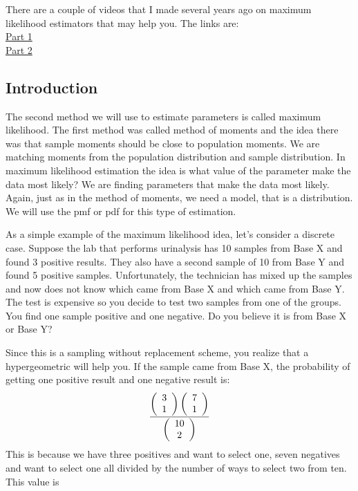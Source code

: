 \documentclass[]{book}
\theoremstyle{definition}
\theoremstyle{definition}
\theoremstyle{definition}
\theoremstyle{remark}
\begin{document}
There are a couple of videos that I made several years ago on maximum
likelihood estimators that may help you. The links are:\\
\href{https://www.youtube.com/watch?v=Y17eACMRw2Y}{Part 1}\\
\href{https://www.youtube.com/watch?v=46C5-g7W6fE}{Part 2}

\subsection{Introduction}\label{introduction-3}

The second method we will use to estimate parameters is called maximum
likelihood. The first method was called method of moments and the idea
there was that sample moments should be close to population moments. We
are matching moments from the population distribution and sample
distribution. In maximum likelihood estimation the idea is what value of
the parameter make the data most likely? We are finding parameters that
make the data most likely. Again, just as in the method of moments, we
need a model, that is a distribution. We will use the pmf or pdf for
this type of estimation.

As a simple example of the maximum likelihood idea, let's consider a
discrete case. Suppose the lab that performs urinalysis has 10 samples
from Base X and found 3 positive results. They also have a second sample
of 10 from Base Y and found 5 positive samples. Unfortunately, the
technician has mixed up the samples and now does not know which came
from Base X and which came from Base Y. The test is expensive so you
decide to test two samples from one of the groups. You find one sample
positive and one negative. Do you believe it is from Base X or Base Y?

Since this is a sampling without replacement scheme, you realize that a
hypergeometric will help you. If the sample came from Base X, the
probability of getting one positive result and one negative result is:
\[{\left( \begin{array}{c} 3 \\ 1 \end{array} \right) \left( \begin{array}{c} 7 \\ 1 \end{array} \right) \over \left( \begin{array}{c} 10 \\ 2 \end{array} \right)}\]
This is because we have three positives and want to select one, seven
negatives and want to select one all divided by the number of ways to
select two from ten. This value is
\end{document}
